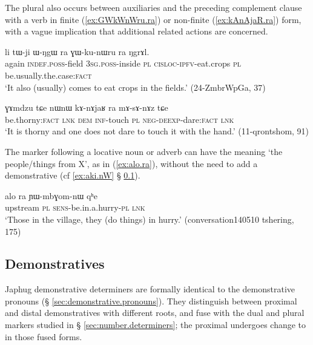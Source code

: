  
The plural  also occurs between auxiliaries and the preceding complement clause with a verb in finite (\ref{ex:GWkWnWru.ra}) or non-finite (\ref{ex:kAnAjaR.ra}) form, with a vague implication that additional related actions are concerned.

\begin{exe}
\ex \label{ex:GWkWnWru.ra}
 \gll li tɯ-ji ɯ-ŋgɯ ra ɣɯ-ku-nɯru ra ŋgrɤl. \\
 again \textsc{indef}.\textsc{poss}-field \textsc{3sg}.\textsc{poss}-inside \textsc{pl} \textsc{cisloc}-\textsc{ipfv}-eat.crops \textsc{pl} be.usually.the.case:\textsc{fact} \\
\glt `It also (usually) comes to eat crops in the fields.' (24-ZmbrWpGa, 37)
\end{exe}

\begin{exe}
\ex \label{ex:kAnAjaR.ra}
 \gll  ɣɤmdzu tɕe nɯnɯ kɤ-nɤjaʁ ra mɤ-sɤ-nɤz tɕe \\
be.thorny:\textsc{fact} \textsc{lnk} \textsc{dem} \textsc{inf}-touch \textsc{pl} \textsc{neg}-\textsc{deexp}-dare:\textsc{fact} \textsc{lnk} \\
\glt `It is thorny and one does not dare to touch it with the hand.' (11-qrontshom, 91)
\end{exe}

The marker  following a locative noun or adverb can have the meaning `the people/things from X', as in (\ref{ex:alo.ra}), without the need to add a demonstrative (cf \ref{ex:aki.nW} § \ref{sec:demonstrative.determiners}).

\begin{exe}
\ex \label{ex:alo.ra}
 \gll alo ra ɲɯ-mbɣom-nɯ qʰe \\
 upstream \textsc{pl} \textsc{sens}-be.in.a.hurry-\textsc{pl} \textsc{lnk} \\
 \glt `Those in the village, they (do things) in hurry.' (conversation140510 tshering, 175)
\end{exe}

\subsection{Demonstratives} \label{sec:demonstrative.determiners}
Japhug demonstrative determiners are formally identical  to the demonstrative pronouns (§ \ref{sec:demonstrative.pronouns}). They distinguish between proximal and distal demonstratives with different roots, and fuse with the dual and plural markers studied in § \ref{sec:number.determiners}; the proximal  undergoes change to  in those fused forms.

